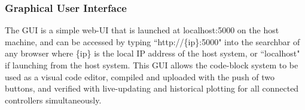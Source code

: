 \documentclass[../main.tex]{subfiles}
\begin{document}
\subsubsection{Graphical User Interface}
The GUI is a simple web-UI that is launched at localhost:5000 on the host machine, and can be accessed by typing ``http://\{ip\}:5000" into the searchbar of any browser where \{ip\} is the local IP address of the host system, or ``localhost" if launching from the host system. This GUI allows the code-block system to be used as a visual code editor, compiled and uploaded with the push of two buttons, and verified with live-updating and historical plotting for all connected controllers simultaneously.
\end{document}
